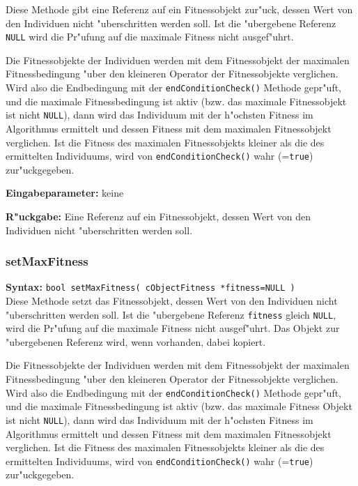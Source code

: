 Diese Methode gibt eine Referenz auf ein Fitnessobjekt zur"uck, dessen Wert von den Individuen nicht "uberschritten werden soll. Ist die "ubergebene Referenz \verb|NULL| wird die Pr"ufung auf die maximale Fitness nicht ausgef"uhrt.

Die Fitnessobjekte der Individuen werden mit dem Fitnessobjekt der maximalen Fitnessbedingung "uber den kleineren Operator der Fitnessobjekte verglichen. Wird also die Endbedingung mit der \verb|endConditionCheck()| Methode gepr"uft, und die maximale Fitnessbedingung ist aktiv (bzw. das maximale Fitnessobjekt ist nicht \verb|NULL|), dann wird das Individuum mit der h"ochsten Fitness im Algorithmus ermittelt und dessen Fitness mit dem maximalen Fitnessobjekt verglichen. Ist die Fitness des maximalen Fitnessobjekts kleiner als die des ermittelten Individuums, wird von \verb|endConditionCheck()| wahr (=\verb|true|) zur"uckgegeben.

\bigskip\noindent
\textbf{Eingabeparameter:} keine

\bigskip\noindent
\textbf{R"uckgabe:} Eine Referenz auf ein Fitnessobjekt, dessen Wert von den Individuen nicht "uberschritten werden soll.


\subsubsection{setMaxFitness}

\textbf{Syntax:} \verb|bool setMaxFitness( cObjectFitness *fitness=NULL )| \\

Diese Methode setzt das Fitnessobjekt, dessen Wert von den Individuen nicht "uberschritten werden soll. Ist die "ubergebene Referenz \verb|fitness| gleich \verb|NULL|, wird die Pr"ufung auf die maximale Fitness nicht ausgef"uhrt. Das Objekt zur "ubergebenen Referenz wird, wenn vorhanden, dabei kopiert.

Die Fitnessobjekte der Individuen werden mit dem Fitnessobjekt der maximalen Fitnessbedingung "uber den kleineren Operator der Fitnessobjekte verglichen. Wird also die Endbedingung mit der \verb|endConditionCheck()| Methode gepr"uft, und die maximale Fitnessbedingung ist aktiv (bzw. das maximale Fitness Objekt ist nicht \verb|NULL|), dann wird das Individuum mit der h"ochsten Fitness im Algorithmus ermittelt und dessen Fitness mit dem maximalen Fitnessobjekt verglichen. Ist die Fitness des maximalen Fitnessobjekts kleiner als die des ermittelten Individuums, wird von \verb|endConditionCheck()| wahr (=\verb|true|) zur"uckgegeben.

